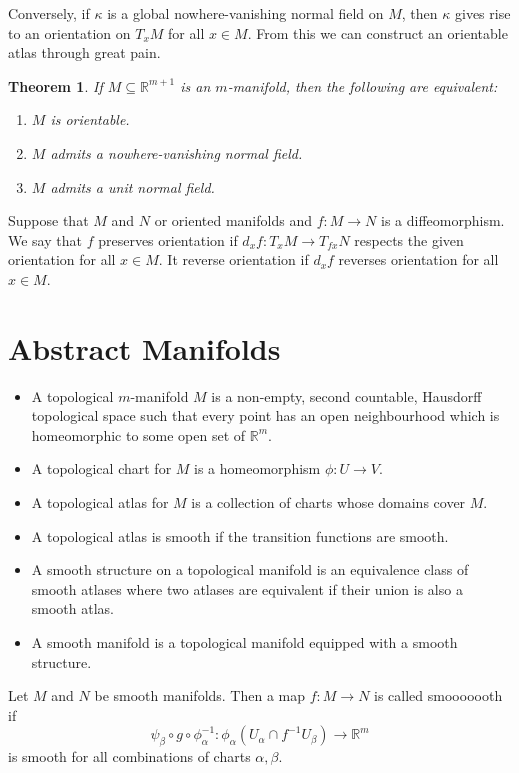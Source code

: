 \documentclass[11pt]{article}
\newcommand{\R}{\mathbb{R}}
\newenvironment{defin}
	{\begin{mdframed}[backgroundcolor=white, roundcorner=5pt, linewidth=1pt, linecolor=RoyalBlue]
		\setlength{\parindent}{0pt}}
	{\end{mdframed}}
\newcommand{\mdf}[1]{{\color{RoyalBlue} #1}}
\newtheorem{theorem}{Theorem}[section]
\begin{document}
Conversely, if $\kappa$ is a global nowhere-vanishing normal field on $M$, then $\kappa$ gives rise to an orientation on $T_xM$ for all $x\in M$.
From this we can construct an orientable atlas through great pain.

\begin{theorem}
If $M\subseteq\R^{m+1}$ is an $m$-manifold, then the following are equivalent:
\begin{enumerate}[label=(\alph*)]
	\item $M$ is orientable.
	\item $M$ admits a nowhere-vanishing normal field.
	\item $M$ admits a unit normal field.
\end{enumerate}
\end{theorem}

\begin{defin}
Suppose that $M$ and $N$ or oriented manifolds and $f:M\to N$ is a diffeomorphism.
We say that $f$ \mdf{preserves orientation} if $d_xf:T_xM \to T_{fx}N$ respects the given orientation for all $x\in M$.
It \mdf{reverse orientation} if $d_xf$ reverses orientation for all $x\in M$.
\end{defin}

\section{Abstract Manifolds}

\begin{defin}
	\begin{itemize}
	\item A \mdf{topological $m$-manifold} $M$ is a non-empty, second countable, Hausdorff topological space such that every point has an open neighbourhood which is homeomorphic to some open set of $\R^m$.
	\item A \mdf{topological chart} for $M$ is a homeomorphism $\phi: U \to V$.
	\item A \mdf{topological atlas} for $M$ is a collection of charts whose domains cover $M$.
	\item A topological atlas is \mdf{smooth} if the transition functions are smooth.
	\item A \mdf{smooth structure} on a topological manifold is an equivalence class of smooth atlases where two atlases are equivalent if their union is also a smooth atlas.
	\item A \mdf{smooth manifold} is a topological manifold equipped with a smooth structure.
	\end{itemize}

	Let $M$ and $N$ be smooth manifolds.
	Then a map $f : M \to N$ is called \mdf{smooooooth} if 
	\[
\psi_\beta \circ g \circ \phi_\alpha^{-1}:\phi_\alpha(U_\alpha\cap f^{-1}U_\beta)\to \R^m
	\]
	is smooth for all combinations of charts $\alpha, \beta$.
\end{defin}
\end{document}

